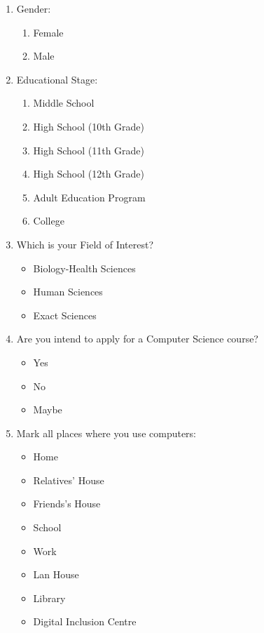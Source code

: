 \begin{enumerate}
    \item Gender:
        \begin{enumerate}
            \item Female
            \item Male
        \end{enumerate}
    \item Educational Stage:
        \begin{enumerate}
            \item Middle School
            \item High School (10th Grade)
            \item High School (11th Grade)
            \item High School (12th Grade)    
            \item Adult Education Program
            \item College        
        \end{enumerate}
    \item Which is your Field of Interest?
        \begin{itemize}
            \item Biology-Health Sciences 
            \item Human Sciences
            \item Exact Sciences    
        \end{itemize}
    \item Are you intend to apply for a Computer Science course?
        \begin{itemize}
            \item Yes
            \item No
            \item Maybe
        \end{itemize}
    \item Mark all places where you use computers:
        \begin{itemize}
            \item Home
            \item Relatives' House
            \item Friends's House
            \item School
            \item Work
            \item Lan House
            \item Library
            \item Digital Inclusion Centre

\end{itemize}
\end{enumerate}
